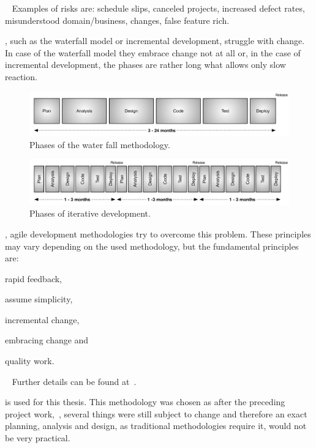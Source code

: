 \documentclass[%
    a4paper,    %
    justified,  %
    nobib,      %
    openany     %
]{tufte-book}
\begin{document}
~\cite{beck-xp-2004} Examples of risks are: schedule slips,
canceled projects, increased defect rates, misunderstood domain/business,
changes, false feature rich.~\cite{beck-xp-2004}

, such as the
waterfall model or incremental development, struggle with change. In case of the
waterfall model they embrace change not at all or, in the case of incremental
development, the phases are rather long what allows only slow reaction.

\begin{figure}[ht]
  \includegraphics[width=0.95\linewidth]{images/waterfall}
  \caption{Phases of the water fall methodology.~\cite[p. 16]{shore-aad-2007}}
  \label{fig:waterfall}
\end{figure}

\begin{figure}[ht]
  \includegraphics[width=0.95\linewidth]{images/iterative-dev}
  \caption{Phases of iterative development.~\cite[p. 16]{shore-aad-2007}}
  \label{fig:iterative-dev}
\end{figure}

, agile development methodologies try
to overcome this problem. These principles may vary depending on the used
methodology, but the fundamental principles are:
\begin{enumerate*}
  \item rapid feedback,
  \item assume simplicity,
  \item incremental change,
  \item embracing change and
  \item quality work.
\end{enumerate*}~\cite{beck-xp-2004}
Further details can be found at~\cite{beck-xp-2004, shore-aad-2007}.

 is used for this thesis.
This methodology was chosen as after the preceding project
work,~, several things were still subject to
change and therefore an exact planning, analysis and design, as traditional
methodologies require it, would not be very practical.
\end{document}
